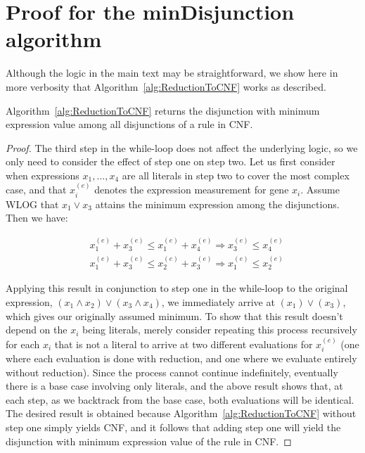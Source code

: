 \section{Proof for the minDisjunction algorithm}

Although the logic in the main text may be straightforward, we show
here in more verbosity that Algorithm~\ref{alg:ReductionToCNF} works
as described.

\begin{Theorem}
\label{thm:ReductionToCNF}
Algorithm~\ref{alg:ReductionToCNF} returns the disjunction with
minimum expression value among all disjunctions of a rule in CNF.
\end{Theorem}

\begin{proof}
The third step in the while-loop does not affect the
underlying logic, so we only need to consider the effect of step one
on step two.  Let us first consider when expressions $x_1, ..., x_4$
are all literals in step two to cover the most complex case, and that
$x_i^{(e)}$ denotes the expression measurement for gene $x_i$. Assume
WLOG that $x_1 \lor x_3$ attains the minimum expression among the
disjunctions. Then we have:

\begin{align*}
&x_{1}^{(e)} + x_{3}^{(e)} \leq x_{1}^{(e)} + x_{4}^{(e)} \Rightarrow x_{3}^{(e)} \leq x_{4}^{(e)} \\
&x_{1}^{(e)} + x_{3}^{(e)} \leq x_{2}^{(e)} + x_{3}^{(e)} \Rightarrow x_{1}^{(e)} \leq x_{2}^{(e)} 
\end{align*}

Applying this result in conjunction to step one in the while-loop to
the original expression, $(x_1 \land x_2) \lor (x_3 \land x_4)$, we
immediately arrive at $(x_1) \lor (x_3)$, which gives our originally
assumed minimum. To show that this result doesn't depend on the $x_i$
being literals, merely consider repeating this process recursively for
each $x_i$ that is not a literal to arrive at two different
evaluations for $x_i^{(e)}$ (one where each evaluation is done with
reduction, and one where we evaluate entirely without reduction).
Since the process cannot continue indefinitely, eventually there is a
base case involving only literals, and the above result shows that, at
each step, as we backtrack from the base case, both evaluations will
be identical. The desired result is obtained because
Algorithm~\ref{alg:ReductionToCNF} without step one simply yields CNF,
and it follows that adding step one will yield the disjunction with
minimum expression value of the rule in CNF.
\end{proof}

